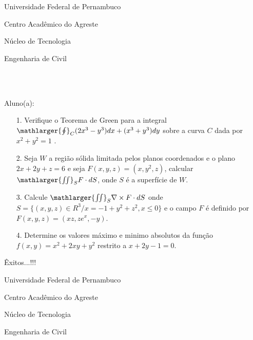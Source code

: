 \documentclass[oneside,a4paper,12pt]{article}
\newcommand{\universidade}{Universidade Federal de Pernambuco}
\newcommand{\centro}{Centro Acadêmico do Agreste}
\newcommand{\departamento}{Núcleo de Tecnologia}
\newcommand{\curso}{Engenharia de Civil}
\begin{document}
	\pagestyle{empty}
	
	\begin{center}
	 	\vspace{0pt}
	 	
		\universidade
		\par
		\centro
		\par
		\departamento
		\par
		\curso
		\par
		\vspace{08pt}
		\\ \\
	\end{center}
	
	
	\begin{flushleft}
		Aluno(a):
	\end{flushleft}
	
\begin{itemize}
\item[1.] Verifique o Teorema de Green para a integral $\mathlarger{\oint}_{C} (2x^{3}-y^{3})dx+(x^{3}+y^{3})dy$ sobre a curva $C$ dada por $x^{2}+y^{2}=1$ .
\end{itemize}
\begin{itemize}
\item[2.] Seja $W$ a região sólida limitada pelos planos coordenados e o plano $2x+2y+z=6$ e seja $F(x,y,z)=(x,y^{2},z)$, calcular $\mathlarger{\iint}_{S}F\cdot dS$, onde $S$ é a superfície de $W$. 
 \end{itemize}
 \begin{itemize}
\item [3.] Calcule $\mathlarger{\iint}_{S} \nabla \times F\cdot dS$ onde $S=\{(x,y,z)\in R^{3}/ x=-1+y^{2}+z^{2}, x\leq 0 \}$ e o campo $F$ é definido por $F(x,y,z)=(xz,ze^{x},-y)$.
\end{itemize}
\begin{itemize}
\item[4.] Determine os valores máximo e minimo absolutos da função $f(x,y)=x^{2}+2xy+y^{2}$ restrito a $x+2y-1=0$.
\end{itemize}

	\flushbottom
	\flushright
     Êxitos...!!!
     \begin{center}
     	\vspace{0pt}
     	
     	\universidade
     	\par
     	\centro
     	\par
     	\departamento
     	\par
     	\curso
     	\par
     	\vspace{08pt}
     	\\ \\
     \end{center}
     
\end{document}
